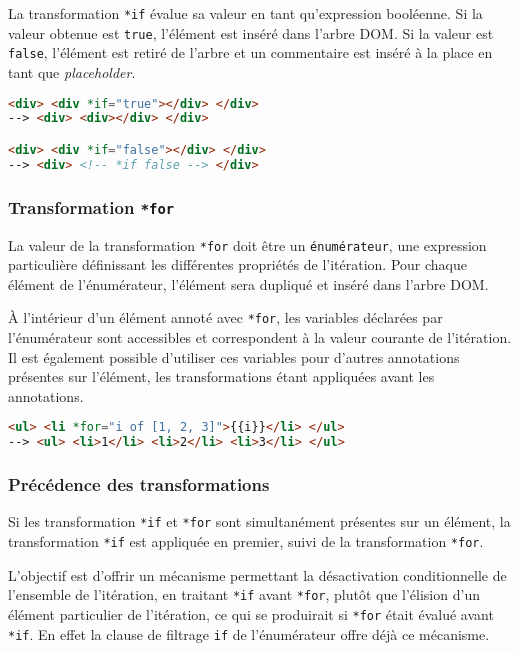 La transformation \texttt{*if} évalue sa valeur en tant qu'expression booléenne. Si la valeur obtenue est \texttt{true}, l'élément est inséré dans l'arbre DOM. Si la valeur est \texttt{false}, l'élément est retiré de l'arbre et un commentaire est inséré à la place en tant que \emph{placeholder}.

\begin{lstlisting}[language=HTML]
<div> <div *if="true"></div> </div>
--> <div> <div></div> </div>

<div> <div *if="false"></div> </div>
--> <div> <!-- *if false --> </div>
\end{lstlisting}

\subsubsection{Transformation \texttt{*for}}
La valeur de la transformation \texttt{*for} doit être un \texttt{énumérateur}, une expression particulière définissant les différentes propriétés de l'itération. Pour chaque élément de l'énumérateur, l'élément sera dupliqué et inséré dans l'arbre DOM.

À l'intérieur d'un élément annoté avec \texttt{*for}, les variables déclarées par l'énumérateur sont accessibles et correspondent à la valeur courante de l'itération. Il est également possible d'utiliser ces variables pour d'autres annotations présentes sur l'élément, les transformations étant appliquées avant les annotations.

\begin{lstlisting}[language=HTML]
<ul> <li *for="i of [1, 2, 3]">{{i}}</li> </ul>
--> <ul> <li>1</li> <li>2</li> <li>3</li> </ul>
\end{lstlisting}

\subsubsection{Précédence des transformations}
Si les transformation \texttt{*if} et \texttt{*for} sont simultanément présentes sur un élément, la transformation \texttt{*if} est appliquée en premier, suivi de la transformation \texttt{*for}.

L'objectif est d'offrir un mécanisme permettant la désactivation conditionnelle de l'ensemble de l'itération, en traitant \texttt{*if} avant \texttt{*for}, plutôt que l'élision d'un élément particulier de l'itération, ce qui se produirait si \texttt{*for} était évalué avant \texttt{*if}. En effet la clause de filtrage \texttt{if} de l'énumérateur offre déjà ce mécanisme.

